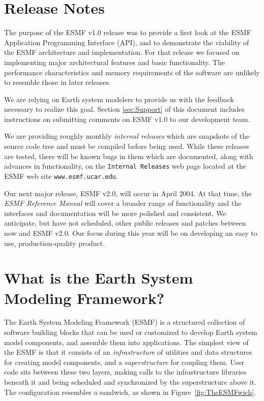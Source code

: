
\section{Release Notes}

The purpose of the ESMF v1.0 release was to provide a first look at the ESMF
Application Programming Interface (API), and to demonstrate the viability 
of the ESMF architecture and implementation.  For that release we focused 
on implementing major architectural features and basic functionality.  The 
performance characteristics and memory requirements of the software 
are unlikely to resemble those in later releases.

We are relying on Earth system modelers to provide us with the feedback 
necessary to realize this goal.  Section \ref{sec:Support} of this document 
includes instructions on submitting comments on ESMF v1.0 to our 
development team.

We are providing roughly monthly {\it internal releases} which are snapshots
of the source code tree and must be compiled before being used.  While these
releases are tested, there will be known bugs in them which are documented,
along with advances in functionality, on the {\tt Internal Releases} web page
located at the ESMF web site {\tt www.esmf.ucar.edu}.

Our next major release, ESMF v2.0, will occur in April 2004.  At that time, 
the {\it ESMF Reference Manual} will cover a broader range of functionality
and the interfaces and documentation will be more polished and consistent.  
We anticipate, but have 
not scheduled, other public releases and patches between now and ESMF v2.0.  
Our focus during this year will be on developing an easy to use, 
production-quality product.  


\section{What is the Earth System Modeling Framework?}

The Earth System Modeling Framework (ESMF) is a structured collection of 
software building blocks that can be used or customized to develop 
Earth system model components, and assemble them into applications.  
The simplest view of the ESMF is that it consists of an
{\it infrastructure} of utilities and data structures for creating 
model components, and a {\it superstructure} for coupling them.  
User code sits between these two layers, making calls to the infrastructure
libraries beneath it and being scheduled and synchronized by the 
superstructure above it.  The configuration resembles a sandwich, as
shown in Figure~\ref{fig:TheESMFwich}.

